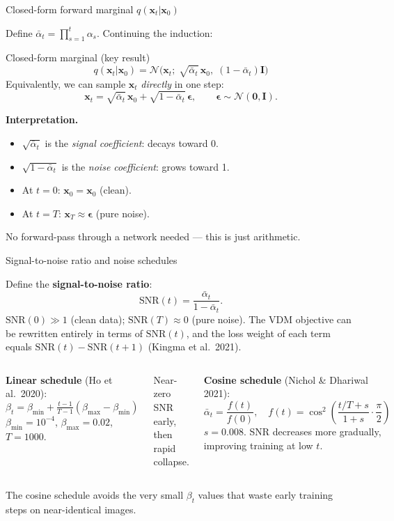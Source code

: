 \documentclass[aspectratio=169,11pt]{beamer}
\newcommand{\Norm}{\mathcal{N}}
\newcommand{\bx}{\bm{x}}
\newcommand{\beps}{\bm{\epsilon}}
\begin{document}
\begin{frame}{Closed-form forward marginal $q(\bx_t|\bx_0)$}

Define $\bar\alpha_t = \prod_{s=1}^{t}\alpha_s$.  Continuing the induction:

\begin{block}{Closed-form marginal (key result)}
\[
\boxed{
  q(\bx_t|\bx_0)
  = \Norm\!\bigl(\bx_t;\;\sqrt{\bar\alpha_t}\,\bx_0,\;
    (1-\bar\alpha_t)\mathbf{I}\bigr)
}
\]
Equivalently, we can sample $\bx_t$ \emph{directly} in one step:
\[
  \bx_t = \sqrt{\bar\alpha_t}\,\bx_0 + \sqrt{1-\bar\alpha_t}\,\beps,
  \qquad \beps\sim\Norm(\bm{0},\mathbf{I}).
\]
\end{block}

\medskip
\textbf{Interpretation.}
\begin{itemize}
  \item $\sqrt{\bar\alpha_t}$ is the \emph{signal coefficient}: decays toward 0.
  \item $\sqrt{1-\bar\alpha_t}$ is the \emph{noise coefficient}: grows toward 1.
  \item At $t=0$: $\bx_0 = \bx_0$ (clean).
  \item At $t=T$: $\bx_T\approx\beps$ (pure noise).
\end{itemize}
No forward-pass through a network needed — this is just arithmetic.
\end{frame}

\begin{frame}{Signal-to-noise ratio and noise schedules}

Define the \textbf{signal-to-noise ratio}:
\[
  \mathrm{SNR}(t) = \frac{\bar\alpha_t}{1-\bar\alpha_t}.
\]
$\mathrm{SNR}(0)\gg 1$ (clean data); $\mathrm{SNR}(T)\approx 0$ (pure noise).
The VDM objective can be rewritten entirely in terms of $\mathrm{SNR}(t)$,
and the loss weight of each term equals $\mathrm{SNR}(t)-\mathrm{SNR}(t+1)$
(Kingma et al.\ 2021).

\bigskip
\begin{columns}[T]
\textbf{Linear schedule} (Ho et al.\ 2020):
\[
  \beta_t = \beta_{\min} + \tfrac{t-1}{T-1}(\beta_{\max}-\beta_{\min})
\]
$\beta_{\min}=10^{-4}$, $\beta_{\max}=0.02$, $T=1000$.
\smallskip

Near-zero SNR early, then rapid collapse.

\textbf{Cosine schedule} (Nichol \& Dhariwal 2021):
\[
  \bar\alpha_t = \frac{f(t)}{f(0)},\quad
  f(t) = \cos^2\!\!\left(\frac{t/T + s}{1+s}\cdot\frac{\pi}{2}\right)
\]
$s=0.008$. SNR decreases more gradually, improving training at low $t$.
\end{columns}

\medskip
The cosine schedule avoids the very small $\beta_t$ values that waste
early training steps on near-identical images.
\end{frame}
\end{document}
